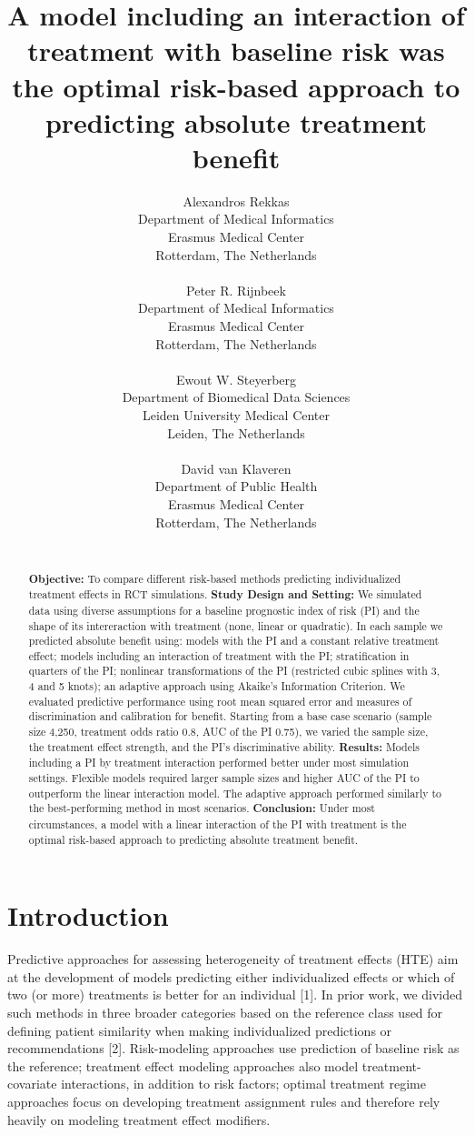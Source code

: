 \documentclass{article}
\title{A model including an interaction of treatment with baseline risk
was the optimal risk-based approach to predicting absolute treatment
benefit}
\author{
    Alexandros Rekkas
   \\
    Department of Medical Informatics \\
    Erasmus Medical Center \\
  Rotterdam, The Netherlands \\
  \texttt{} \\
   \And
    Peter R. Rijnbeek
   \\
    Department of Medical Informatics \\
    Erasmus Medical Center \\
  Rotterdam, The Netherlands \\
  \texttt{} \\
   \And
    Ewout W. Steyerberg
   \\
    Department of Biomedical Data Sciences \\
    Leiden University Medical Center \\
  Leiden, The Netherlands \\
  \texttt{} \\
   \And
    David van Klaveren
   \\
    Department of Public Health \\
    Erasmus Medical Center \\
  Rotterdam, The Netherlands \\
  \texttt{} \\
  }
\date{}
\begin{document}
\maketitle

\def\tightlist{}


\begin{abstract}
\textbf{Objective:} To compare different risk-based methods predicting
individualized treatment effects in RCT simulations. \textbf{Study
Design and Setting:} We simulated data using diverse assumptions for a
baseline prognostic index of risk (PI) and the shape of its
intereraction with treatment (none, linear or quadratic). In each sample
we predicted absolute benefit using: models with the PI and a constant
relative treatment effect; models including an interaction of treatment
with the PI; stratification in quarters of the PI; nonlinear
transformations of the PI (restricted cubic splines with 3, 4 and 5
knots); an adaptive approach using Akaike's Information Criterion. We
evaluated predictive performance using root mean squared error and
measures of discrimination and calibration for benefit. Starting from a
base case scenario (sample size 4,250, treatment odds ratio 0.8, AUC of
the PI 0.75), we varied the sample size, the treatment effect strength,
and the PI's discriminative ability. \textbf{Results:} Models including
a PI by treatment interaction performed better under most simulation
settings. Flexible models required larger sample sizes and higher AUC of
the PI to outperform the linear interaction model. The adaptive approach
performed similarly to the best-performing method in most scenarios.
\textbf{Conclusion:} Under most circumstances, a model with a linear
interaction of the PI with treatment is the optimal risk-based approach
to predicting absolute treatment benefit.
\end{abstract}


\hypertarget{introduction}{%
\section{Introduction}\label{introduction}}

Predictive approaches for assessing heterogeneity of treatment effects
(HTE) aim at the development of models predicting either individualized
effects or which of two (or more) treatments is better for an individual
{[}1{]}. In prior work, we divided such methods in three broader
categories based on the reference class used for defining patient
similarity when making individualized predictions or recommendations
{[}2{]}. Risk-modeling approaches use prediction of baseline risk as the
reference; treatment effect modeling approaches also model
treatment-covariate interactions, in addition to risk factors; optimal
treatment regime approaches focus on developing treatment assignment
rules and therefore rely heavily on modeling treatment effect modifiers.
\end{document}
